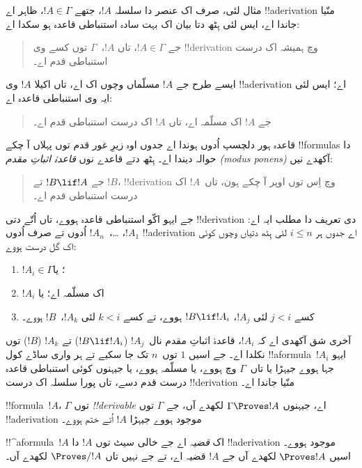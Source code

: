 \documentclass[../../../include/open-logic-section]{subfiles}
\begin{document}
مثال لئی، صرف اک عنصر دا سلسلہ $!A$، جتھے $!A \in \Gamma$، ظاہر اے
!!a{derivation} منّیا جاندا اے، ایس لئی ہِٹھ دتا بیان اک بہت سادہ
استنباطی قاعدہ ہو سکدا اے:
\begin{quote}
  جے $!A \in \Gamma$، تاں $!A$،~$\Gamma$ توں کسے وی
  !!{derivation} وچ ہمیشہ اک درست استنباطی قدم اے۔
\end{quote}
ایسے طرح جے $!A$ مسلّماں وچوں اک اے، تاں اکیلا $!A$ وی
!!a{derivation} اے؛ ایس لئی ایہ وی استنباطی قاعدہ اے:
\begin{quote}
  جے $!A$ اک مسلّمہ اے، تاں $!A$ اک درست استنباطی قدم اے۔
\end{quote}
قاعدہ ہور دلچسپ اُدوں ہوندا اے جدوں اوہ زیرِ غور قدم توں پہلاں آ چکے
!!{formula}s دا حوالہ دیندا اے۔ ہِٹھ دتے قاعدے نوں \emph{قاعدۂ اثباتِ
مقدم (modus ponens)} آکھدے نیں:
\begin{quote}
  جے $!B \lif !A$ تے $!B$، !!{derivation} وچ اِس توں اوپر آ چکے ہون،
  تاں~$!A$ اک درست استنباطی قدم اے۔
\end{quote}
جے ایہو اکّو استنباطی قاعدہ ہووے، تاں اُتّے دتی !!{derivation} دی
تعریف دا مطلب ایہ اے: $!A_1$، \dots،~$!A_n$ اُدوں تے صرف اُدوں
!!a{derivation} اے جدوں ہر $i \le n$ لئی ہِٹھ دتیاں وچوں کوئی اک
گل درست ہووے:
\begin{enumerate}
\item $!A_i \in \Gamma$؛ یا
\item $!A_i$ اک مسلّمہ اے؛ یا
\item کسے $j < i$ لئی $!A_j$، $!B \lif !A_i$ ہووے، تے کسے $k < i$
  لئی $!A_k$،~$!B$ ہووے۔
\end{enumerate}
آخری شق آکھدی اے کہ $!A_i$، قاعدۂ اثباتِ مقدم نال~$!A_j$
($!B \lif !A_i$) تے $!A_k$ ($!B$) توں نکلدا اے۔ جے اسیں $1$
توں~$n$ تک جا سکیے تے ہر واری ساڈے کول !!a{formula}~$!A_i$
ایہو جہا ہووے جیہڑا یا تاں~$\Gamma$ وچ ہووے، یا مسلّمہ ہووے، یا
جیہنوں کوئی استنباطی قاعدہ درست قدم دسے، تاں پورا سلسلہ اک درست
!!{derivation} منّیا جاندا اے۔

\begin{defn}[!!^{derivability}]
!!{formula}~$!A$، $\Gamma$ توں \emph{!!{derivable}} اے، جیہنوں
$\Gamma \Proves !A$ لکھدے آں، جے $\Gamma$ توں !!a{derivation}
موجود ہووے جیہڑا $!A$ اُتے ختم ہووے۔
\end{defn}

\begin{defn}[قضیے]
!!^a{formula}~$!A$ اک \emph{قضیہ} اے جے خالی سیٹ توں $!A$ دا
!!a{derivation} موجود ہووے۔ اسیں $\Proves !A$ لکھدے آں جے $!A$
قضیہ اے، تے جے نہیں تاں $\Proves/ !A$ لکھدے آں۔
\end{defn}
\end{document}

